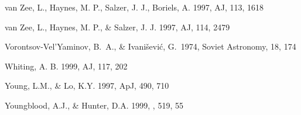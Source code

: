 \documentclass[12pt,preprint]{emulateapj}
\begin{document}
\begin{thebibliography}{}
van Zee, L., Haynes, M. P., Salzer, J. J., Boriels, A. 1997, AJ, 113, 1618

van Zee, L., Haynes, M. P., \& Salzer, J. J. 1997, AJ, 114, 2479

Vorontsov-Vel'Yaminov, B.~A., \& 
Ivani{\v s}evi{\'c}, G.\ 1974, Soviet Astronomy, 18, 174 

Whiting, A. B. 1999, AJ, 117, 202

Young, L.M., \& Lo, K.Y. 1997, ApJ, 490, 710
 
Youngblood, A.J., \& Hunter, D.A. 1999, \apj , 519, 55

\end{thebibliography}

\clearpage



\end{document}
